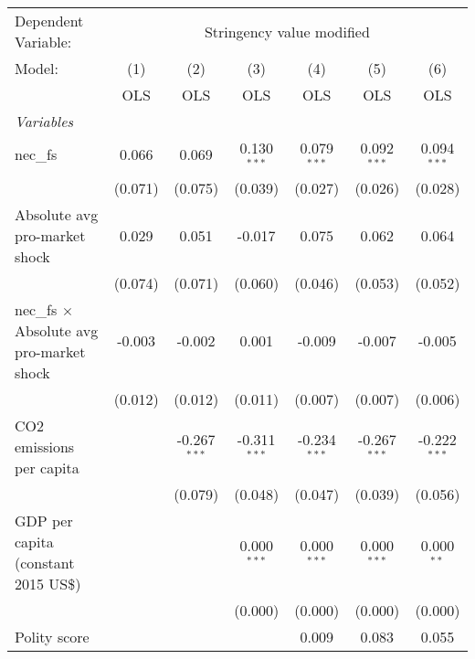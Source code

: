 
\begingroup
\centering
\begin{tabular}{lcccccc}
   \toprule
   Dependent Variable: & \multicolumn{6}{c}{Stringency value modified}\\
   Model:                                           & (1)     & (2)            & (3)            & (4)            & (5)            & (6)\\  
                                                    &  OLS    & OLS            & OLS            & OLS            & OLS            & OLS\\  
   \midrule
   \emph{Variables}\\
   nec\_fs                                          & 0.066   & 0.069          & 0.130$^{***}$  & 0.079$^{***}$  & 0.092$^{***}$  & 0.094$^{***}$\\   
                                                    & (0.071) & (0.075)        & (0.039)        & (0.027)        & (0.026)        & (0.028)\\   
   Absolute avg pro-market shock                    & 0.029   & 0.051          & -0.017         & 0.075          & 0.062          & 0.064\\   
                                                    & (0.074) & (0.071)        & (0.060)        & (0.046)        & (0.053)        & (0.052)\\   
   nec\_fs $\times$ Absolute avg pro-market shock   & -0.003  & -0.002         & 0.001          & -0.009         & -0.007         & -0.005\\   
                                                    & (0.012) & (0.012)        & (0.011)        & (0.007)        & (0.007)        & (0.006)\\   
   CO2 emissions per capita                         &         & -0.267$^{***}$ & -0.311$^{***}$ & -0.234$^{***}$ & -0.267$^{***}$ & -0.222$^{***}$\\   
                                                    &         & (0.079)        & (0.048)        & (0.047)        & (0.039)        & (0.056)\\   
   GDP per capita (constant 2015 US\$)              &         &                & 0.000$^{***}$  & 0.000$^{***}$  & 0.000$^{***}$  & 0.000$^{**}$\\   
                                                    &         &                & (0.000)        & (0.000)        & (0.000)        & (0.000)\\   
   Polity score                                     &         &                &                & 0.009          & 0.083          & 0.055\\   

\end{tabular}
